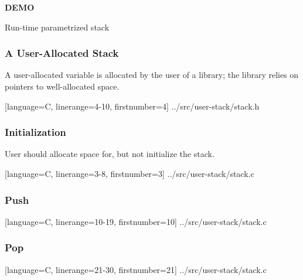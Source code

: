 \begin{frame}

\begin{center}

\Huge \textbf{DEMO}

\bigskip

\large Run-time parametrized stack

\end{center}

\end{frame}


\begin{frame}[fragile]

\frametitle{A User-Allocated Stack}

\begin{center}

A user-allocated variable is allocated by the user of a library; the library
relies on pointers to well-allocated space.

\end{center}

\pause

\vspace{\fill}

%
  [language=C, linerange={4-10}, firstnumber=4]%
  {../src/user-stack/stack.h}

\end{frame}


\begin{frame}[fragile]

\frametitle{Initialization}

\begin{center}

User should allocate space for, but not initialize the stack.

\end{center}

%
  [language=C, linerange={3-8}, firstnumber=3]%
  {../src/user-stack/stack.c}

\end{frame}


\begin{frame}[fragile]

\frametitle{Push}

%
  [language=C, linerange={10-19}, firstnumber=10]%
  {../src/user-stack/stack.c}

\end{frame}


\begin{frame}[fragile]

\frametitle{Pop}

%
  [language=C, linerange={21-30}, firstnumber=21]%
  {../src/user-stack/stack.c}

\end{frame}


